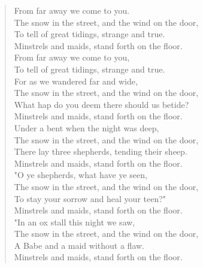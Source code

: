 
\begin{verse}
From far away we come to you.\\
\hspace*{2em}The snow in the street, and the wind on the door,\\
To tell of great tidings, strange and true.\\
\hspace*{2em}Minstrels and maids, stand forth on the floor.\\
\hspace*{4em}From far away we come to you,\\
\hspace*{4em}To tell of great tidings, strange and true.\\[0.7em]

For as we wandered far and wide,\\
\hspace*{2em}The snow in the street, and the wind on the door,\\
What hap do you deem there should us betide?\\
\hspace*{2em}Minstrels and maids, stand forth on the floor.\\[0.7em]

Under a bent when the night was deep,\\
\hspace*{2em}The snow in the street, and the wind on the door,\\
There lay three shepherds, tending their sheep.\\
\hspace*{2em}Minstrels and maids, stand forth on the floor.\\[0.7em]

"O ye shepherds, what have ye seen,\\
\hspace*{2em}The snow in the street, and the wind on the door,\\
To stay your sorrow and heal your teen?"\\
\hspace*{2em}Minstrels and maids, stand forth on the floor.\\[0.7em]

"In an ox stall this night we saw,\\
\hspace*{2em}The snow in the street, and the wind on the door,\\
A Babe and a maid without a flaw.\\
\hspace*{2em}Minstrels and maids, stand forth on the floor.\\[0.7em]


\end{verse}
